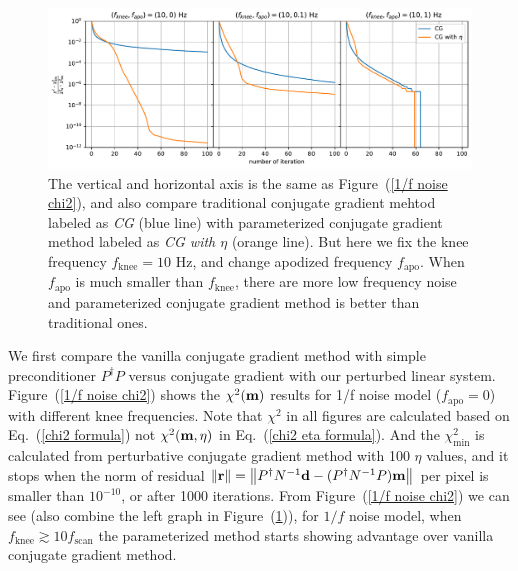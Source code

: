 \documentclass[twocolumn,linenumbers]{aastex631}
\newcommand{\vbd}{\vb{d}}
\newcommand{\vbm}{\vb{m}}
\newcommand{\inv}[1]{#1^{-1}}
\newcommand{\Pdagger}{P^{\dagger}}
\newcommand{\kmh}[1]{\textcolor{red}{KMH: #1}}
\begin{document}
\begin{figure}[]
\centering
\includegraphics[width=\textwidth]{apodized_noise_chi2.pdf}
\caption{
    The vertical and horizontal axis is the same as Figure~(\ref{1/f noise chi2}),
    and also compare traditional conjugate gradient mehtod labeled as \textit{CG} (blue line) 
    with parameterized conjugate gradient method labeled as \textit{CG with $\eta$} (orange line).
    But here we fix the knee frequency $f_\text{knee} = 10$ Hz, and change apodized frequency $f_\text{apo}$.
    When $f_\text{apo}$ is much smaller than $f_\text{knee}$, there are more low frequency noise and
    parameterized conjugate gradient method is better than traditional ones.
}
\label{apo noise chi2}
\end{figure}



We first compare the vanilla conjugate gradient method with
simple preconditioner $\Pdagger P$ versus conjugate gradient with our perturbed linear system.
Figure~(\ref{1/f noise chi2}) shows the $\chi^2(\vbm)$ results for 1/f noise model ($f_\text{apo}=0$)
with different knee frequencies.
Note that $\chi^2$ in all figures are calculated based on
Eq.~(\ref{chi2 formula})
not $\chi^2(\vbm, \eta)$ in Eq.~(\ref{chi2 eta formula}).
And the $\chi^2_{\text{min}}$ is calculated from perturbative conjugate gradient
method with 100 $\eta$ values, and it stops when the norm of residual 
$\norm{\vb{r}} = \norm{\Pdagger \inv{N}\vbd - (\Pdagger\inv{N}P) \vbm}$
per pixel is smaller than $10^{-10}$, or after 1000 iterations.
From Figure~(\ref{1/f noise chi2}) we can see (also combine the left graph in Figure~(\ref{apo noise chi2})),
for $1/f$ noise model, when $f_\text{knee} \gtrsim 10 f_\text{scan}$
the parameterized method starts showing advantage over vanilla conjugate gradient method.
\end{document}
